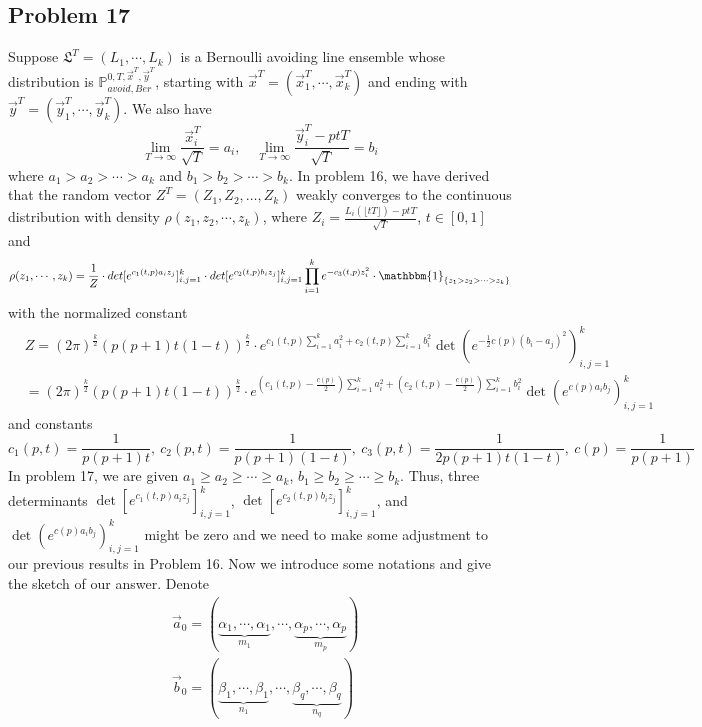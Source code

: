 \documentclass[12pt]{article}
\begin{document}
\subsection*{Problem 17}
Suppose $\mathfrak{L}^{T}=(L_{1},\cdots,L_{k})$ is a Bernoulli avoiding line ensemble whose distribution is $\mathbb{P}_{avoid, Ber}^{0,T,\vec{x}^{T},\vec{y}^{T}}$, starting with $\vec{x}^{T}=(\vec{x}^{T}_{1},\cdots,\vec{x}^{T}_{k})$ and ending with $\vec{y}^{T}=(\vec{y}^{T}_{1},\cdots,\vec{y}^{T}_{k})$. We also have $$\lim_{T\rightarrow\infty}\frac{\vec{x}_{i}^{T}}{\sqrt{T}}=a_{i}, \quad\lim_{T\rightarrow\infty}\frac{\vec{y}_{i}^{T}-ptT}{\sqrt{T}}=b_{i}$$ where $a_{1}>a_{2}>\cdots> a_{k}$ and $b_{1}>b_{2}>\cdots> b_{k}$. In problem 16, we have derived that the random vector $Z^{T}=(Z_{1},Z_{2},\dots,Z_{k})$ weakly converges to the continuous distribution with density $\rho(z_{1},z_{2},\cdots,z_{k})$, where $Z_{i}=\frac{L_{i}(\lfloor tT \rfloor)-ptT}{\sqrt{T}}$, $t\in[0,1]$ and 
$$\rho(z_{1},\cdots,z_{k})=\frac{1}{Z}\cdot det[e^{c_1(t,p)a_{i}z_{j}}]_{i,j=1}^{k}\cdot det[e^{c_2(t,p)b_{i}z_{j}}]_{i,j=1}^{k}\prod_{i=1}^{k}e^{-c_{3}(t,p)z_{i}^{2}}\cdot\mathbbm{1}_{\{z_1>z_{2}>\cdots>z_{k}\}}$$ with the normalized constant 
\begin{align*}
	&Z=(2\pi)^{\frac{k}{2}}(p(p+1)t(1-t))^{\frac{k}{2}}\cdot e^{c_{1}(t,p)\sum_{i=1}^{k}a_{i}^{2}+c_{2}(t,p)\sum_{i=1}^{k}b_{i}^{2}} \det(e^{-\frac{1}{2}c(p)(b_{i}-a_{j})^{2}})_{i,j=1}^{k}\\
	& =(2\pi)^{\frac{k}{2}}(p(p+1)t(1-t))^{\frac{k}{2}}\cdot e^{(c_{1}(t,p)-\frac{c(p)}{2})\sum_{i=1}^{k}a_{i}^{2}+(c_{2}(t,p)-\frac{c(p)}{2})\sum_{i=1}^{k}b_{i}^{2}}\det(e^{c(p)a_{i}b_{j}})_{i,j=1}^{k}
\end{align*}
and constants $$c_{1}(p,t)=\frac{1}{p(p+1)t},\ c_{2}(p,t)=\frac{1}{p(p+1)(1-t)},\ c_{3}(p,t)=\frac{1}{2p(p+1)t(1-t)},\ c(p)=\frac{1}{p(p+1)}$$
In problem 17, we are given $a_{1}\geqslant a_{2}\geqslant\cdots\geqslant a_{k}$, $b_{1}\geqslant b_{2}\geqslant\cdots\geqslant b_{k}$. Thus, three determinants $\det[e^{c_1(t,p)a_{i}z_{j}}]_{i,j=1}^{k}$, $\det[e^{c_2(t,p)b_{i}z_{j}}]_{i,j=1}^{k}$, and $\det(e^{c(p)a_{i}b_{j}})_{i,j=1}^{k}$ might be zero and we need to make some adjustment to our previous results in Problem 16. Now we introduce some notations and give the sketch of our answer.
Denote
\begin{align*}
	&\vec{a}_{0}=(\underbrace{\alpha_{1},\cdots,\alpha_{1}}_{m_{1}},\cdots,\underbrace{\alpha_{p},\cdots,\alpha_{p}}_{m_{p}})\\
	&\vec{b}_{0}=(\underbrace{\beta_{1},\cdots,\beta_{1}}_{n_{1}},\cdots,\underbrace{\beta_{q},\cdots,\beta_{q}}_{n_{q}})
\end{align*}
\end{document}
